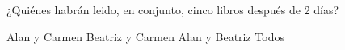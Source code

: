  ¿Quiénes habr\'an leido, en conjunto, cinco libros despu\'es de 2 d\'ias?

\begin{choices}\footnotesize
    \CorrectChoice Alan y Carmen
    \choice Beatriz y Carmen
    \choice Alan y Beatriz
    \choice Todos
\end{choices}
